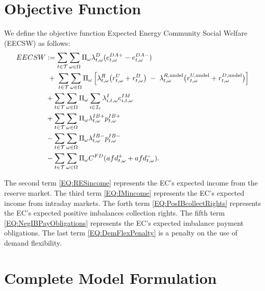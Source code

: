 \documentclass{article}
\begin{document}
\section{Objective Function}
\label{SEC:ObjectiveFunction}

We define the objective function Expected Energy Community Social Welfare (EECSW) as follows:
\begin{subequations}
	\begin{align}
    EECSW & := \sum_{t \in \mathcal{T}} \sum_{\omega \in \Omega} \Pi_{\omega} \lambda^D_{t, \omega} (e^{DA+}_{t, \omega} - e^{DA-}_{t, \omega}) \label{EQ:DAincome} \\
&\;+\;
\sum_{t \in \mathcal{T}}
\sum_{\omega \in \Omega}
    \Pi_{\omega}\,
    \Bigl[
      \lambda^{R}_{t,\omega}
        \bigl(r^{U}_{t,\omega} + r^{D}_{t,\omega}\bigr)
      \;-\;
      \lambda^{R,\text{undel}}_{t,\omega}
        \bigl(r^{U,\text{undel}}_{t,\omega} + r^{D,\text{undel}}_{t,\omega}\bigr)
    \Bigr] \label{EQ:RESincome} \\
		& + \sum_{t \in \mathcal{T}} \sum_{\omega \in \Omega} \Pi_{\omega} \sum_{i \in \mathcal{I}_t} \lambda^{I}_{i, t, \omega} e^{IM}_{i, t, \omega} \label{EQ:IMincome} \\
		& + \sum_{t \in \mathcal{T}} \sum_{\omega \in \Omega} \Pi_{\omega} \lambda^{IB+}_{t, \omega} p^{IB+}_{t, \omega} \label{EQ:PosIBcollectRights} \\
		& - \sum_{t \in \mathcal{T}} \sum_{\omega \in \Omega} \Pi_{\omega} \lambda^{IB-}_{t, \omega} p^{IB-}_{t, \omega} \label{EQ:NegIBPayObligations} \\
		& - \sum_{t \in \mathcal{T}} \sum_{\omega \in \Omega} \Pi_{\omega} C^{FD} (afd^+_{t, \omega} + afd^-_{t, \omega}). \label{EQ:DemFlexPenalty}
	\end{align}
	\label{EQ:EECSW}
\end{subequations}

The second term \eqref{EQ:RESincome} represents the EC's expected income from the reserve market. The third term \eqref{EQ:IMincome} represents the EC's expected income from intraday markets. The forth term \eqref{EQ:PosIBcollectRights} represents the EC's expected positive imbalances collection rights. The fifth term \eqref{EQ:NegIBPayObligations} represents the EC's expected imbalance payment obligations. The last term \eqref{EQ:DemFlexPenalty} is a penalty on the use of demand flexibility.

\section{Complete Model Formulation}
\label{SEC:CompleteModelFormulation}
\end{document}
